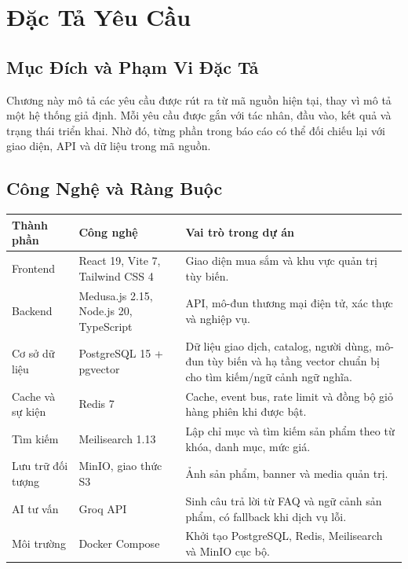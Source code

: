 \chapter{Đặc Tả Yêu Cầu}

\section{Mục Đích và Phạm Vi Đặc Tả}

Chương này mô tả các yêu cầu được rút ra từ mã nguồn hiện tại, thay vì mô tả một hệ thống giả định. Mỗi yêu cầu được gắn với tác nhân, đầu vào, kết quả và trạng thái triển khai. Nhờ đó, từng phần trong báo cáo có thể đối chiếu lại với giao diện, API và dữ liệu trong mã nguồn.

\section{Công Nghệ và Ràng Buộc}

\begin{longtable}{@{}L{0.22\textwidth} L{0.25\textwidth} L{0.45\textwidth}@{}}
  \toprule
  \textbf{Thành phần} & \textbf{Công nghệ} & \textbf{Vai trò trong dự án} \\
  \midrule
  \endhead
  Frontend & React 19, Vite 7, Tailwind CSS 4 & Giao diện mua sắm và khu vực quản trị tùy biến. \\[3pt]
  Backend & Medusa.js 2.15, Node.js 20, TypeScript & API, mô-đun thương mại điện tử, xác thực và nghiệp vụ. \\[3pt]
  Cơ sở dữ liệu & PostgreSQL 15 + pgvector & Dữ liệu giao dịch, catalog, người dùng, mô-đun tùy biến và hạ tầng vector chuẩn bị cho tìm kiếm/ngữ cảnh ngữ nghĩa. \\[3pt]
  Cache và sự kiện & Redis 7 & Cache, event bus, rate limit và đồng bộ giỏ hàng phiên khi được bật. \\[3pt]
  Tìm kiếm & Meilisearch 1.13 & Lập chỉ mục và tìm kiếm sản phẩm theo từ khóa, danh mục, mức giá. \\[3pt]
  Lưu trữ đối tượng & MinIO, giao thức S3 & Ảnh sản phẩm, banner và media quản trị. \\[3pt]
  AI tư vấn & Groq API & Sinh câu trả lời từ FAQ và ngữ cảnh sản phẩm, có fallback khi dịch vụ lỗi. \\[3pt]
  Môi trường & Docker Compose & Khởi tạo PostgreSQL, Redis, Meilisearch và MinIO cục bộ. \\
  \bottomrule
\end{longtable}

